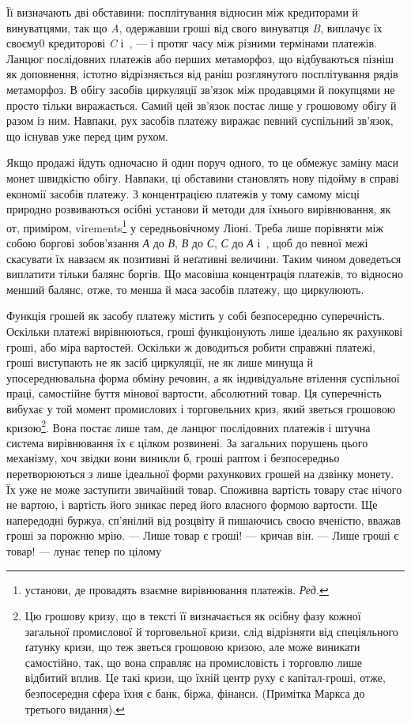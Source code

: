 \parcont{}  %
Її визначають дві обставини: посплітування відносин між кредиторами й винуватцями,
так що \emph{A}, одержавши гроші від свого винуватця \emph{B}, виплачує їх своєму0
кредиторові \emph{C} і~, — і протяг часу між різними термінами платежів.
Ланцюг послідовних платежів або перших метаморфоз, що відбуваються
пізніш як доповнення, істотно відрізняється від раніш розглянутого посплітування
рядів метаморфоз. В обігу засобів циркуляції зв’язок між продавцями й покупцями
не просто тільки виражається. Самий цей зв’язок постає лише у грошовому обігу й
разом із ним. Навпаки, рух засобів платежу виражає певний
суспільний зв’язок, що існував уже перед цим рухом.

Якщо продажі йдуть одночасно й один поруч одного, то це обмежує заміну маси монет
швидкістю обігу. Навпаки, ці обставини становлять нову підойму в справі економії
засобів платежу. З концентрацією платежів у тому самому місці природно
розвиваються осібні установи й методи для їхнього
вирівнювання, як от, приміром, virements\footnote*{
установи, де провадять взаємне вирівнювання платежів. \emph{Ред.}
} у середньовічному Ліоні. Треба лише порівняти між собою
боргові зобов’язання \emph{А} до \emph{В}, \emph{В} до \emph{С}, \emph{С} до
\emph{А} і~, щоб до певної межі скасувати їх навзаєм як
позитивні й неґативні величини. Таким чином доведеться виплатити тільки балянс
боргів. Що масовіша концентрація платежів, то відносно менший балянс, отже, то
менша й маса засобів платежу, що циркулюють.

Функція грошей як засобу платежу містить у собі безпосередню суперечність.
Оскільки платежі вирівнюються, гроші функціонують лише ідеально як рахункові
гроші, або міра вартостей. Оскільки ж
доводиться робити справжні платежі, гроші
виступають не як засіб циркуляції, не як лише минуща й упосереднювальна форма
обміну речовин, а як індивідуальне втілення суспільної праці, самостійне буття
мінової вартости, абсолютний товар. Ця суперечність вибухає у той момент
промислових і торговельних криз, який зветься грошовою кризою\footnote{
Цю грошову кризу, що в тексті її визначається як осібну фазу кожної загальної
промислової й торговельної кризи, слід відрізняти від спеціяльного ґатунку
кризи, що теж зветься грошовою кризою, але може виникати самостійно, так, що
вона справляє на промисловість і торговлю лише відбитий вплив.
Це такі кризи, що їхній центр руху є капітал-гроші, отже, безпосередня сфера
їхня є банк, біржа, фінанси. (Примітка Маркса до третього видання).
}.
Вона постає лише там, де ланцюг послідовних платежів і штучна система
вирівнювання їх є цілком розвинені. За загальних порушень цього механізму,
хоч звідки вони виникли б, гроші раптом і безпосередньо перетворюються з лише
ідеальної форми рахункових грошей на дзвінку монету. Їх уже не може заступити
звичайний товар. Споживна вартість товару стає нічого не вартою, і вартість його
зникає перед його власного формою вартости. Ще напередодні буржуа, сп’янілий
від розцвіту й пишаючись своєю вченістю, вважав гроші за порожню мрію. — Лише
товар є гроші! — кричав він. — Лише гроші є товар! — лунає тепер по цілому
\parbreak{}  %
